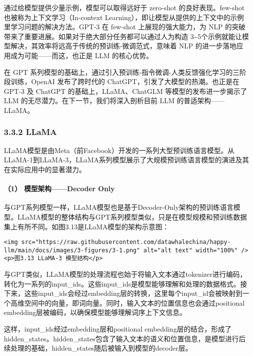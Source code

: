 \documentclass[
]{article}
\begin{document}
通过给模型提供少量示例，模型可以取得远好于 zero-shot
的良好表现。few-shot 也被称为上下文学习（In-context
Learning），即让模型从提供的上下文中的示例里学习问题的解决方法。GPT-3 在
few-shot 上展现的强大能力，为 NLP
的突破带来了重要进展。如果对于绝大部分任务都可以通过人为构造
3\textasciitilde5个示例就能让模型解决，其效率将远高于传统的预训练-微调范式，意味着
NLP 的进一步落地应用成为可能------而这，也正是 LLM 的核心优势。

在 GPT
系列模型的基础上，通过引入预训练-指令微调-人类反馈强化学习的三阶段训练，OpenAI
发布了跨时代的 ChatGPT，引发了大模型的热潮。也正是在 GPT-3 及 ChatGPT
的基础上，LLaMA、ChatGLM 等模型的发布进一步揭示了 LLM
的无尽潜力。在下一节，我们将深入剖析目前 LLM 的普适架构------LLaMA。

\subsubsection{3.3.2 LLaMA}\label{llama}

LLaMA模型是由Meta（前Facebook）开发的一系列大型预训练语言模型。从LLaMA-1到LLaMA-3，LLaMA系列模型展示了大规模预训练语言模型的演进及其在实际应用中的显著潜力。

\paragraph{（1） 模型架构------Decoder
Only}\label{ux6a21ux578bux67b6ux6784decoder-only-1}

与GPT系列模型一样，LLaMA模型也是基于Decoder-Only架构的预训练语言模型。LLaMA模型的整体结构与GPT系列模型类似，只是在模型规模和预训练数据集上有所不同。如图3.13是LLaMA模型的架构示意图：

\begin{verbatim}
<img src="https://raw.githubusercontent.com/datawhalechina/happy-llm/main/docs/images/3-figures/3-1.png" alt="alt text" width="100%" />
<p>图3.13 LLaMA-3 模型结构</p>
\end{verbatim}

与GPT类似，LLaMA模型的处理流程也始于将输入文本通过tokenizer进行编码，转化为一系列的input\_ids。这些input\_ids是模型能够理解和处理的数据格式。接下来，这些input\_ids会经过embedding层的转换，这里每个input\_id会被映射到一个高维空间中的向量，即词向量。同时，输入文本的位置信息也会通过positional
embedding层被编码，以确保模型能够理解词序上下文信息。

这样，input\_ids经过embedding层和positional
embedding层的结合，形成了hidden\_states。hidden\_states包含了输入文本的语义和位置信息，是模型进行后续处理的基础，hidden\_states随后被输入到模型的decoder层。
\end{document}
